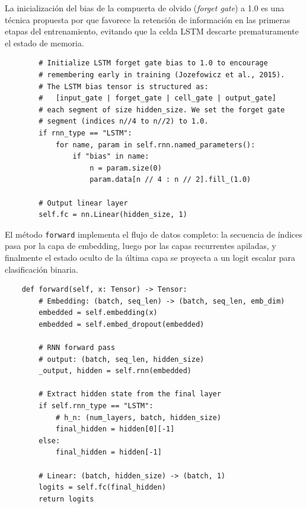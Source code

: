 La inicialización del bias de la compuerta de olvido (\textit{forget gate}) a 1.0 es una técnica propuesta por \cite{jozefowicz2015} que favorece la retención de información en las primeras etapas del entrenamiento, evitando que la celda LSTM descarte prematuramente el estado de memoria.

\begin{verbatim}
        # Initialize LSTM forget gate bias to 1.0 to encourage
        # remembering early in training (Jozefowicz et al., 2015).
        # The LSTM bias tensor is structured as:
        #   [input_gate | forget_gate | cell_gate | output_gate]
        # each segment of size hidden_size. We set the forget gate
        # segment (indices n//4 to n//2) to 1.0.
        if rnn_type == "LSTM":
            for name, param in self.rnn.named_parameters():
                if "bias" in name:
                    n = param.size(0)
                    param.data[n // 4 : n // 2].fill_(1.0)

        # Output linear layer
        self.fc = nn.Linear(hidden_size, 1)
\end{verbatim}

El método \texttt{forward} implementa el flujo de datos completo: la secuencia de índices pasa por la capa de embedding, luego por las capas recurrentes apiladas, y finalmente el estado oculto de la última capa se proyecta a un logit escalar para clasificación binaria.

\begin{verbatim}
    def forward(self, x: Tensor) -> Tensor:
        # Embedding: (batch, seq_len) -> (batch, seq_len, emb_dim)
        embedded = self.embedding(x)
        embedded = self.embed_dropout(embedded)

        # RNN forward pass
        # output: (batch, seq_len, hidden_size)
        _output, hidden = self.rnn(embedded)

        # Extract hidden state from the final layer
        if self.rnn_type == "LSTM":
            # h_n: (num_layers, batch, hidden_size)
            final_hidden = hidden[0][-1]
        else:
            final_hidden = hidden[-1]

        # Linear: (batch, hidden_size) -> (batch, 1)
        logits = self.fc(final_hidden)
        return logits
\end{verbatim}


